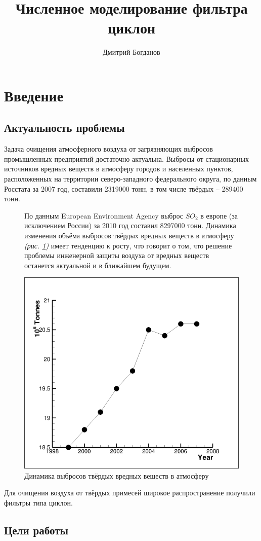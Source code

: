 \documentclass[pdftex,a4paper,12pt]{article}
\title{Численное моделирование фильтра циклон}
\author{Дмитрий Богданов}
\date{}
\begin{document}

\tableofcontents
\newpage
\section{Введение}
\subsection{Актуальность проблемы}
	\hspace{2em} 	Задача очищения атмосферного воздуха от загрязняющих выбросов промышленных предприятий достаточно актуальна. Выбросы от стационарных источников вредных веществ в атмосферу городов и населенных пунктов, расположенных на территории северо-западного федерального округа,  по данным Росстата за 2007 год,  составили 2319000 тонн, в том числе твёрдых -- 289400 тонн.
	\begin{figure}[ht]
		\vspace{-1.4em}
		\begin{minipage}[b]{0.48\linewidth}
		По данным European Environment Agency выброс $SO_2$ в европе (за исключением России) за 2010 год составил 8297000 тонн.
			Динамика изменения объёма выбросов твёрдых вредных веществ в атмосферу \textit{(рис. \ref{figure:atmosphereDynamic})} имеет тенденцию к росту, что говорит о том, что решение проблемы инженерной защиты воздуха от вредных веществ останется актуальной и в ближайшем будущем. 
		\end{minipage}
		\hspace{0.04\linewidth}
		\begin{minipage}[b]{0.48\linewidth}
			\centering
			\includegraphics[scale=0.2]{atmosphereDynamic}
			\caption{Динамика выбросов твёрдых вредных веществ в атмосферу}
			\label{figure:atmosphereDynamic}
		\end{minipage}
	\end{figure}
	
	Для очищения воздуха от твёрдых примесей широкое распространение получили фильтры типа циклон. 
	\subsection{Цели работы}
\end{document}
